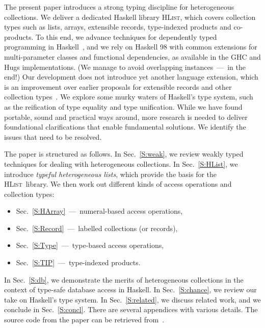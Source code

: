 \documentclass[nocopyrightspace,preprint]{sigplan-proc}
\newcommand{\hwVsTr}[2]{#2}
\newcommand{\HList}{\textsc{HList}}
\newcommand{\noskip}{\topsep0pt \parskip0pt \partopsep0pt}
\begin{document}
The present paper introduces a strong typing discipline for
heterogeneous collections. We deliver a dedicated Haskell library
\HList, which covers collection types such as lists, arrays,
extensible records, type-indexed products and co-products. To this
end, we advance techniques for dependently typed programming in
Haskell~\cite{Hallgren01,Fake}, and we rely on Haskell 98 with common
extensions for multi-parameter classes and functional dependencies, as
available in the GHC and Hugs implementations. (We manage to avoid
overlapping instances~---~in the end!) Our development does not
introduce yet another language extension, which is an improvement over
earlier proposals for extensible records and other collection
types~\cite{GJ96,SM01,NTGS02,PJM03}. We explore some murky waters of
Haskell's type system, such as the reification of type equality and
type unification. While we have found portable, sound and practical
ways around, more research is needed to deliver foundational
clarifications that enable fundamental solutions. We identify the
issues that need to be resolved.

The paper is structured as follows. In Sec.~\ref{S:weak}, we review
weakly typed techniques for dealing with heterogeneous
collections. In Sec.~\ref{S:HList}, we introduce \emph{typeful
heterogeneous lists}, which provide the basis for the \HList\
library. We then work out different kinds of access operations
and collection types:
%
\begin{itemize}\noskip
\item Sec.~\ref{S:HArray}~---~numeral-based access operations,
\item Sec.~\ref{S:Record}~---~labelled collections (or records),
\item Sec.~\ref{S:Type}~---~type-based access operations,
\item Sec.~\ref{S:TIP}~---~type-indexed products.
\end{itemize}
%
In Sec.~\ref{S:db}, we demonstrate the merits of heterogeneous
collections in the context of type-safe database access in Haskell. In
Sec.~\ref{S:chance}, we review our take on Haskell's type system. In
Sec.~\ref{S:related}, we discuss related work, and we conclude in
Sec.~\ref{S:concl}. \hwVsTr{}{There are several appendices with
various details.} The source code from the paper \hwVsTr{and extra
appendices}{} can be retrieved from~\cite{HList}.



\end{document}
